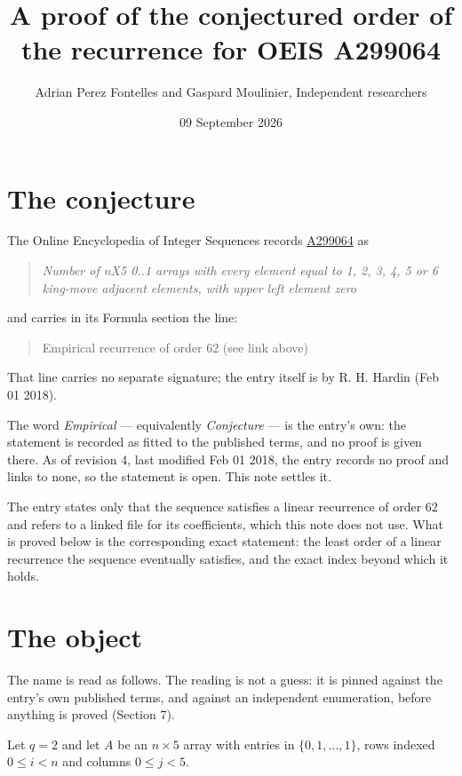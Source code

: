 \documentclass[11pt]{article}
\title{A proof of the conjectured order of the recurrence for OEIS A299064}
\author{Adrian Perez Fontelles and Gaspard Moulinier, Independent researchers}
\date{09 September 2026}
\theoremstyle{definition}
\begin{document}
\maketitle
\section{The conjecture}

The Online Encyclopedia of Integer Sequences records \href{https://oeis.org/A299064}{A299064} as

\begin{quote}\itshape Number of nX5 0..1 arrays with every element equal to 1, 2, 3, 4, 5 or 6 king-move adjacent elements, with upper left element zero\end{quote}

and carries in its Formula section the line:

\begin{quote}\ttfamily Empirical recurrence of order 62 (see link above)\end{quote}

That line carries no separate signature; the entry itself is by R. H. Hardin (Feb 01 2018).

The word {\itshape Empirical} --- equivalently {\itshape Conjecture} --- is the entry's own: the statement is recorded as fitted to the published terms, and no proof is given there. As of revision 4, last modified Feb 01 2018, the entry records no proof and links to none, so the statement is open. This note settles it.

The entry states only that the sequence satisfies a linear recurrence of order $62$ and refers to a linked file for its coefficients, which this note does not use. What is proved below is the corresponding exact statement: the least order of a linear recurrence the sequence eventually satisfies, and the exact index beyond which it holds.

\section{The object}

The name is read as follows. The reading is not a guess: it is pinned against the entry's own published terms, and against an independent enumeration, before anything is proved (Section 7).

Let $q = 2$ and let $A$ be an $n \times 5$ array with entries in $\{0,1,\dots,1\}$, rows indexed $0 \le i < n$ and columns $0 \le j < 5$.
\end{document}
